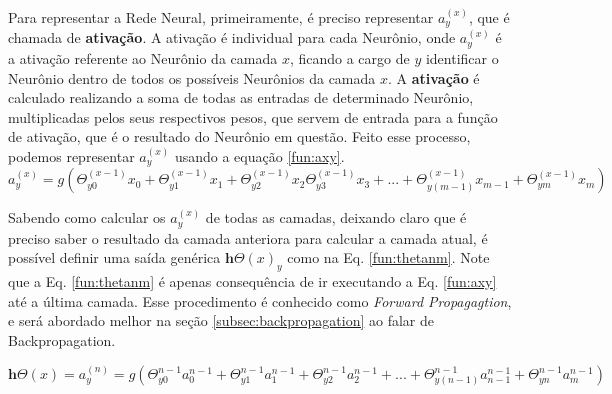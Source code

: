 \begin{figure}
\label{fg:rede_neural_generica}
\end{figure}


Para representar a Rede Neural, primeiramente, é preciso  representar $a^{(x)}_y$, que é chamada de \textbf{ativação}. A ativação é individual para cada Neurônio, onde $a^{(x)}_y$ é a ativação referente ao Neurônio da camada $x$, ficando a cargo de $y$ identificar o Neurônio dentro de todos os possíveis Neurônios da camada $x$. A \textbf{ativação} é calculado realizando a soma de todas as entradas de determinado Neurônio, multiplicadas pelos seus respectivos pesos, que servem de entrada para a função de ativação, que é o resultado do Neurônio em questão. Feito esse processo, podemos representar $a^{(x)}_y$ usando a equação \ref{fun:axy}.
\begin{equation}
    a^{(x)}_y=g(\Theta^{(x-1)}_{y0}x{}_0+\Theta^{(x-1)}_{y1}x{}_1+\Theta^{(x-1)}_{y2}x{}_2\Theta^{(x-1)}_{y3}x{}_3+...+\Theta^{(x-1)}_{y(m-1)}x{}_{m-1}+\Theta^{(x-1)}_{ym}x{}_m )
    \label{fun:axy}
\end{equation}


Sabendo como calcular os $a^{(x)}_y$ de todas as camadas, deixando claro que é preciso saber o resultado da camada anteriora para calcular a camada atual, é possível definir uma saída genérica $\mathbf{h}{\Theta}(x)_y$ como na  Eq. \ref{fun:thetanm}. Note que a Eq. \ref{fun:thetanm} é apenas consequência de ir executando a Eq.  \ref{fun:axy} até a última camada. Esse procedimento é conhecido como \textit{Forward Propagagtion}, e será abordado melhor na seção \ref{subsec:backpropagation} ao falar de Backpropagation.

\begin{equation}
    \mathbf{h}{\Theta}(x) = a^{(n)}_y = g(\Theta^{n-1}_{y0}a^{n-1}_{0}+\Theta^{n-1}_{y1}a^{n-1}_{1}+\Theta^{n-1}_{y2}a^{n-1}_{2}+...+\Theta^{n-1}_{y(n-1)}a^{n-1}_{n-1}+\Theta^{n-1}_{yn}a^{n-1}_{m})
     \label{fun:thetanm}
\end{equation}


